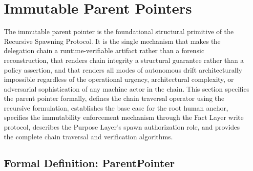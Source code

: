 \section{Immutable Parent Pointers}
\label{sec:immutable-parent-pointers}

The immutable parent pointer is the foundational structural primitive of the Recursive Spawning Protocol. It is the single mechanism that makes the delegation chain a runtime-verifiable artifact rather than a forensic reconstruction, that renders chain integrity a structural guarantee rather than a policy assertion, and that renders all modes of autonomous drift architecturally impossible regardless of the operational urgency, architectural complexity, or adversarial sophistication of any machine actor in the chain. This section specifies the parent pointer formally, defines the chain traversal operator using the recursive formulation, establishes the base case for the root human anchor, specifies the immutability enforcement mechanism through the Fact Layer write protocol, describes the Purpose Layer's spawn authorization role, and provides the complete chain traversal and verification algorithms.

\subsection{Formal Definition: ParentPointer}
\label{sec:parent-pointer-definition}

